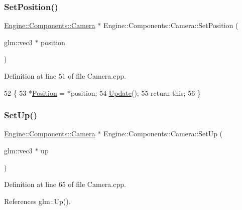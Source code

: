 \subsubsection{\texorpdfstring{Set\+Position()}{SetPosition()}}
{\footnotesize\ttfamily \mbox{\hyperlink{classEngine_1_1Components_1_1Camera}{Engine\+::\+Components\+::\+Camera}} $\ast$ Engine\+::\+Components\+::\+Camera\+::\+Set\+Position (\begin{DoxyParamCaption}\item[{glm\+::vec3 $\ast$}]{position }\end{DoxyParamCaption})}



Definition at line 51 of file Camera.\+cpp.


\begin{DoxyCode}
52 \{
53     *\mbox{\hyperlink{classEngine_1_1Components_1_1Camera_ab2c3ed9a1321a95db8fca95bc7f4b290}{Position}} = *position;
54     \mbox{\hyperlink{classEngine_1_1Components_1_1Camera_a364f5e22921e3d234b31297a64c7d932}{Update}}();
55     \textcolor{keywordflow}{return} \textcolor{keyword}{this};
56 \}
\end{DoxyCode}
\mbox{\label{classEngine_1_1Components_1_1Camera_ac044899d9fbfa3818c99676855ec19fb}} 
\subsubsection{\texorpdfstring{Set\+Up()}{SetUp()}}
{\footnotesize\ttfamily \mbox{\hyperlink{classEngine_1_1Components_1_1Camera}{Engine\+::\+Components\+::\+Camera}} $\ast$ Engine\+::\+Components\+::\+Camera\+::\+Set\+Up (\begin{DoxyParamCaption}\item[{glm\+::vec3 $\ast$}]{up }\end{DoxyParamCaption})}



Definition at line 65 of file Camera.\+cpp.



References glm\+::\+Up().


